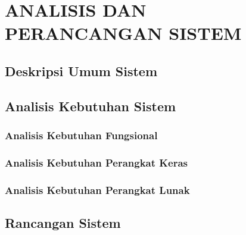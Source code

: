 \documentclass[ugmtesis]{ugmtesis}
\begin{document}
	



\chapter{ANALISIS DAN PERANCANGAN SISTEM}
\label{ANALISIS DAN PERANCANGAN SISTEM}

	\section{Deskripsi Umum Sistem}
	\label{rancangan deskripsi umum sistem}
	

	\section{Analisis Kebutuhan Sistem}
	\label{rancangan analisis kebutuhan sistem}
	

		\subsection{Analisis Kebutuhan Fungsional}
		\label{rancangan kebutuhan fungsional}
		

		\subsection{Analisis Kebutuhan Perangkat Keras}
		\label{rancangan analisis kebutuhan perangkat keras}
		

		\subsection{Analisis Kebutuhan Perangkat Lunak}
		\label{rancangan analisis kebutuhan perangkat lunak}
		

	\section{Rancangan Sistem}
	\label{rancangan sistem}
	
\end{document}
